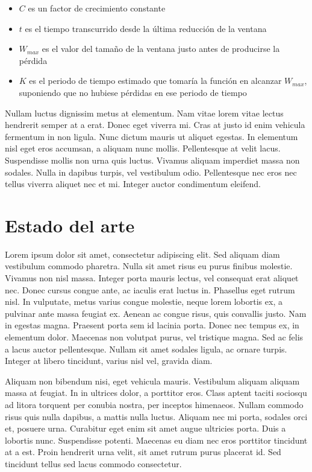 \begin{itemize}
\item $C$ es un factor de crecimiento constante
\item $t$ es el tiempo transcurrido desde la última reducción de la ventana
\item $W_{max}$ es el valor del tamaño de la ventana justo antes de producirse la pérdida
\item $K$ es el periodo de tiempo estimado que tomaría la función en alcanzar $W_{max}$, suponiendo que no hubiese pérdidas en ese periodo de tiempo
\end{itemize}

Nullam luctus dignissim metus at elementum. Nam vitae lorem vitae lectus hendrerit semper at a erat. Donec eget viverra mi. Cras at justo id enim vehicula fermentum in non ligula. Nunc dictum mauris ut aliquet egestas. In elementum nisl eget eros accumsan, a aliquam nunc mollis. Pellentesque at velit lacus. Suspendisse mollis non urna quis luctus. Vivamus aliquam imperdiet massa non sodales. Nulla in dapibus turpis, vel vestibulum odio. Pellentesque nec eros nec tellus viverra aliquet nec et mi. Integer auctor condimentum eleifend.



\chapter{Estado del arte}

Lorem ipsum dolor sit amet, consectetur adipiscing elit. Sed aliquam diam vestibulum commodo pharetra. Nulla sit amet risus eu purus finibus molestie. Vivamus non nisl massa. Integer porta mauris lectus, vel consequat erat aliquet nec. Donec cursus congue ante, ac iaculis erat luctus in. Phasellus eget rutrum nisl. In vulputate, metus varius congue molestie, neque lorem lobortis ex, a pulvinar ante massa feugiat ex. Aenean ac congue risus, quis convallis justo. Nam in egestas magna. Praesent porta sem id lacinia porta. Donec nec tempus ex, in elementum dolor. Maecenas non volutpat purus, vel tristique magna. Sed ac felis a lacus auctor pellentesque. Nullam sit amet sodales ligula, ac ornare turpis. Integer at libero tincidunt, varius nisl vel, gravida diam.

Aliquam non bibendum nisi, eget vehicula mauris. Vestibulum aliquam aliquam massa at feugiat. In in ultrices dolor, a porttitor eros. Class aptent taciti sociosqu ad litora torquent per conubia nostra, per inceptos himenaeos. Nullam commodo risus quis nulla dapibus, a mattis nulla luctus. Aliquam nec mi porta, sodales orci et, posuere urna. Curabitur eget enim sit amet augue ultricies porta. Duis a lobortis nunc. Suspendisse potenti. Maecenas eu diam nec eros porttitor tincidunt at a est. Proin hendrerit urna velit, sit amet rutrum purus placerat id. Sed tincidunt tellus sed lacus commodo consectetur.

